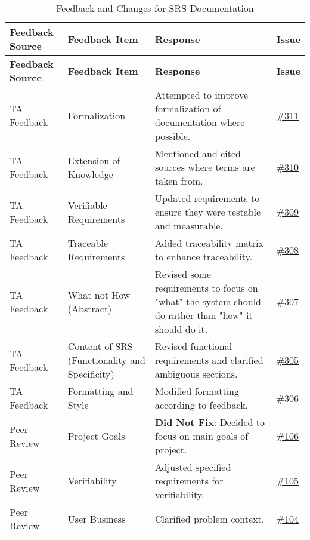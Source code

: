 \documentclass{article}
\begin{document}
\begin{longtable}{| p{} | p{} | p{} | p{} |}
    \caption{Feedback and Changes for SRS Documentation} \\
    \hline
    \textbf{Feedback Source} & \textbf{Feedback Item} & \textbf{Response} & \textbf{Issue} \\
    \hline
    \endfirsthead
    \hline
    \textbf{Feedback Source} & \textbf{Feedback Item} & \textbf{Response} & \textbf{Issue} \\
    \hline
    \endhead
    \hline
    \endfoot
    TA Feedback & Formalization & Attempted to improve formalization of documentation where possible. & \href{https://github.com/TPGEngine/tpg/issues/311}{\#311}\\
    \hline
    TA Feedback & Extension of Knowledge & Mentioned and cited sources where terms are taken from. & \href{https://github.com/TPGEngine/tpg/issues/310}{\#310} \\
    \hline
    TA Feedback & Verifiable Requirements & Updated requirements to ensure they were testable and measurable. & \href{https://github.com/TPGEngine/tpg/issues/309}{\#309}\\
    \hline
    TA Feedback & Traceable Requirements & Added traceability matrix to enhance traceability. & \href{https://github.com/TPGEngine/tpg/issues/308}{\#308} \\
    \hline
    TA Feedback & What not How (Abstract) & Revised some requirements to focus on "what" the system should do rather than "how" it should do it. & \href{https://github.com/TPGEngine/tpg/issues/307}{\#307} \\
    \hline
    TA Feedback & Content of SRS (Functionality and Specificity) & Revised functional requirements and clarified ambiguous sections. & \href{https://github.com/TPGEngine/tpg/issues/305}{\#305} \\
    \hline
    TA Feedback & Formatting and Style & Modified formatting according to feedback. & \href{https://github.com/TPGEngine/tpg/issues/306}{\#306} \\
    \hline
    Peer Review & Project Goals & \textbf{Did Not Fix}: Decided to focus on main goals of project. & \href{https://github.com/TPGEngine/tpg/issues/106}{\#106} \\
    \hline
    Peer Review & Verifiability & Adjusted specified requirements for verifiability.  & \href{https://github.com/TPGEngine/tpg/issues/105}{\#105} \\
    \hline
    Peer Review & User Business & Clarified problem context. & \href{https://github.com/TPGEngine/tpg/issues/104}{\#104} \\

\end{longtable}
\end{document}
